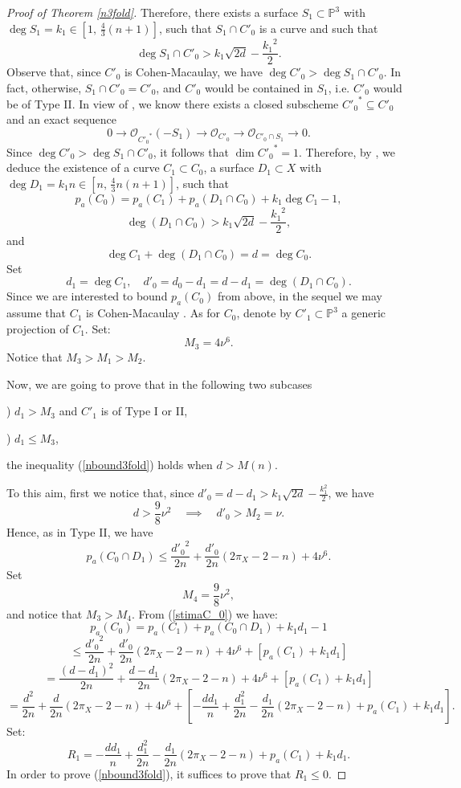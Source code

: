 \documentclass[9pt,a4paper]{amsart}
\theoremstyle{plain}
\theoremstyle{definition}
\theoremstyle{remark}
\begin{document}
\begin{proof}[Proof of Theorem \ref{n3fold}]
Therefore, there exists a surface  $S_1\subset \mathbb P^3$ with
$\deg S_1=k_1\in [1,\,\frac{4}{3}(n+1)]$,  such that $S_1\cap C'_0$
is a curve and such that
$$
\deg S_1\cap C'_0>  k_1\sqrt{2d}-\dfrac{{k_1}^2}{2}.
$$
Observe that, since $C'_0$ is Cohen-Macaulay,  we have $\deg
C'_0>\deg S_1\cap C'_0$. In fact, otherwise,  $S_1\cap C'_0=C'_0$,
and $C'_0$ would be contained in $S_1$, i.e. $C'_0$ would be of Type
II. In view of \cite[Lemma 3.1]{Liu}, we know there exists a closed subscheme ${C'_0}^*\subseteq C'_0$ and an exact sequence
$$
0\to \mathcal O_{{C'_0}^*}(-S_1)\to \mathcal O_{{C'_0}}\to \mathcal O_{C'_0\cap S_1}\to 0.
$$
Since $\deg C'_0>\deg S_1\cap C'_0$, it follows that $\dim {C'_0}^*=1$. Therefore, by
\cite[Proposition 3.15 and proof]{Liu}, we deduce the existence of a  curve $C_1\subset C_0$, a
surface $D_1\subset X$  with $\deg D_1=k_1n\in
[n,\,\frac{4}{3}n(n+1)]$, such that
\begin{equation}\label{stimaC_0}
p_a(C_0)=p_a(C_1)+p_a(D_1\cap C_0)+k_1\deg C_1-1,
\end{equation}
$$
\deg (D_1\cap C_0) >  k_1\sqrt{2d}-\dfrac{{k_1}^2}{2},
$$
and
$$
\deg C_1+\deg(D_1\cap C_0)=d=\deg C_0.
$$
Set
$$
d_1=\deg C_1,\quad d'_0=d_0-d_1=d-d_1=\deg (D_1\cap C_0).
$$
Since we are interested to bound $p_a(C_0)$ from above, in the
sequel we may assume that $C_1$ is Cohen-Macaulay \cite[Lemma
4.3]{Liu2}. As for $C_0$, denote by $C'_1\subset \mathbb P^3$ a generic
projection of $C_1$. Set:
$$
M_3=4\nu^6.
$$
Notice that $M_3>M_1>M_2$.

\smallskip
Now, we are going to prove that in the following two subcases

) $d_1>M_3$ and $C'_1$ is of Type I or II,


) $d_1\leq M_3$,

the inequality (\ref{nbound3fold}) holds when $d>M(n)$.

\smallskip
To this aim, first we notice that, since
$d'_0=d-d_1>k_1\sqrt{2d}-\frac{k_1^2}{2}$, we have
\begin{equation}\label{primod}
d>\frac{9}{8}\nu^2\quad \implies \quad d'_0>M_2=\nu.
\end{equation}
Hence, as in Type II, we have
$$
p_a(C_0\cap D_1)\leq
\frac{{d'_0}^2}{2n}+\frac{d'_0}{2n}(2\pi_X-2-n)+4\nu^6.
$$
Set
$$
M_4=\frac{9}{8}\nu^2,
$$
and notice that $M_3>M_4$. From (\ref{stimaC_0}) we have:
$$
p_a(C_0)=p_a(C_1)+p_a(C_0\cap D_1)+k_1d_1-1
$$
$$
\leq
\frac{{d'_0}^2}{2n}+\frac{d'_0}{2n}(2\pi_X-2-n)+4\nu^6+[p_a(C_1)+k_1d_1]
$$
$$
=\frac{({d-d_1})^2}{2n}+\frac{d-d_1}{2n}(2\pi_X-2-n)+4\nu^6+[p_a(C_1)+k_1d_1]
$$
$$
=\frac{{d}^2}{2n}+\frac{d}{2n}(2\pi_X-2-n)+4\nu^6+\left[-\frac{dd_1}{n}+\frac{d_1^2}{2n}-\frac{d_1}{2n}(2\pi_X-2-n)+p_a(C_1)+k_1d_1\right].
$$
Set:
$$
R_1=-\frac{dd_1}{n}+\frac{d_1^2}{2n}-\frac{d_1}{2n}(2\pi_X-2-n)+p_a(C_1)+k_1d_1.
$$
In order to prove (\ref{nbound3fold}), it suffices to prove that
$R_1\leq 0$.


\end{proof}
\end{document}
